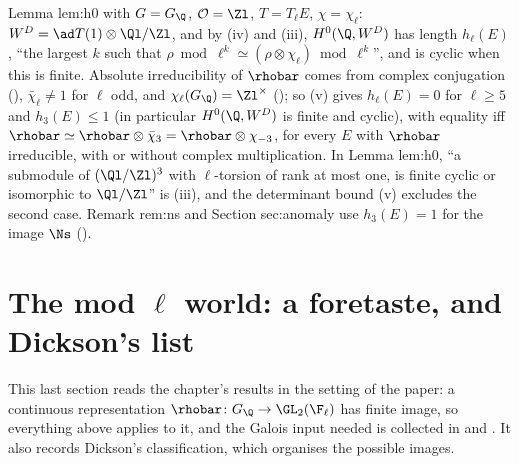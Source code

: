 \begin{paperlink}
Lemma lem:h0 with $G=G_\Q$, $\mathcal{O}=\Zl$, $T=T_\ell E$, $\chi=\chi_\ell$: $W^D=\ad T(1)\otimes\Ql/\Zl$, and by (iv) and (iii), $H^0(\Q,W^D)$ has length
$h_\ell(E)$, ``the largest $k$ such that $\rho\bmod\ell^k\simeq(\rho\otimes\chi_\ell)\bmod\ell^k$'', and is cyclic when this is finite. Absolute irreducibility of $\rhobar$ comes from complex conjugation
(), $\bar\chi_\ell\ne1$ for $\ell$ odd, and $\chi_\ell(G_\Q)=\Zl^\times$ (); so (v) gives $h_\ell(E)=0$ for $\ell\ge5$ and
$h_3(E)\le1$ (in particular $H^0(\Q,W^D)$ is finite and cyclic), with equality iff $\rhobar\simeq\rhobar\otimes\bar\chi_3=\rhobar\otimes\chi_{-3}$, for every $E$ with $\rhobar$ irreducible, with or without complex multiplication.
In Lemma lem:h0, ``a submodule of $(\Ql/\Zl)^3$ with $\ell$-torsion of rank at most one, is finite cyclic or isomorphic to $\Ql/\Zl$'' is (iii),
and the determinant bound (v) excludes the second case. Remark rem:ns and Section
sec:anomaly use $h_3(E)=1$ for the image $\Ns$ ().
\end{paperlink}

\section{The mod \texorpdfstring{$\ell$}{l} world: a foretaste, and Dickson's list}\label{sec:reps:modl}

This last section reads the chapter's results in the setting of the paper: a continuous representation
$\rhobar\colon G_\Q\to\GL_2(\F_\ell)$ has finite image, so everything above applies to it, and the Galois input needed is collected in
 and . It also records Dickson's classification, which organises the possible images.

